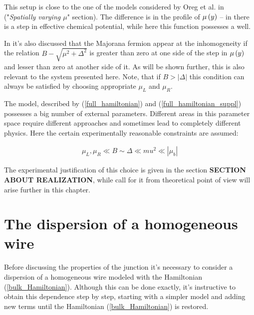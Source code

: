   This setup is close to the one of the models  considered by Oreg et al. in \cite{Oreg_2010} ("\textit{Spatially varying $ \mu $}" section). The difference is in the profile of $ \mu\left(y\right) $ -- in \cite{Oreg_2010}  there is a step in effective chemical potential, while here this function possesses a well.  
  
 In \cite{Oreg_2010} it's also discussed that the Majorana fermion appear at the inhomogeneity if the relation $ B-\sqrt{\mu^2+\Delta^2} $ is greater than zero at one side of the step in $ \mu\left(y\right) $ and lesser than zero at another side of it. As will be shown further, this is also relevant to the  system presented here. Note, that if $ B > \left|\Delta\right| $ this condition can always be satisfied by choosing appropriate $ \mu_L $ and $ \mu_R $. 
 
 The model, described by (\ref{full_hamiltonian}) and (\ref{full_hamiltonian_suppl}) possesses a big number of external parameters. Different areas in this parameter space require different approaches and sometimes lead to completely different physics. Here the certain experimentally reasonable constraints are assumed:
 
 \begin{gather}
 \label{constraints}
 	\mu_L,\mu_R \ll B \sim \Delta \ll mu^2\ll \left|\mu_b\right|
 \end{gather} 

  The experimental justification of this choice is given in the section \textbf{SECTION ABOUT REALIZATION}, while call for it from theoretical point of view will arise further in this chapter.
  


\section{The dispersion of a homogeneous wire}

Before discussing the properties of the junction it's necessary to consider a dispersion of a homogeneous wire modeled with the Hamiltonian (\ref{bulk_Hamiltonian}). Although this can be done exactly, it's instructive to obtain this dependence step by step, starting with a simpler model and adding new terms until the Hamiltonian (\ref{bulk_Hamiltonian}) is restored.

